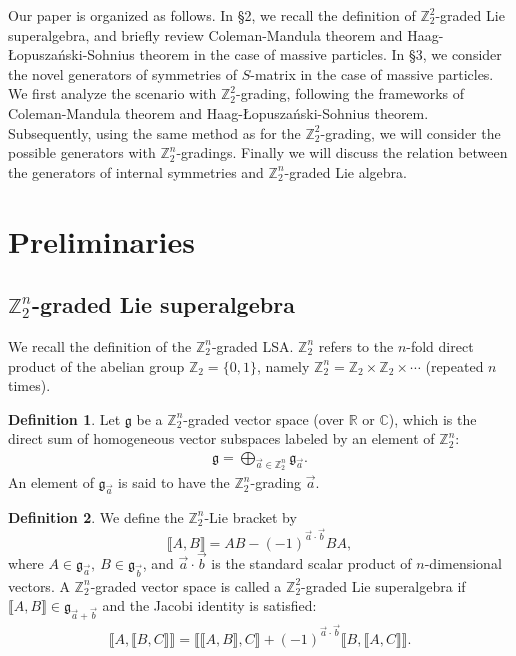 \documentclass[a4paper,12pt]{article}
\def\Z{\mathbb{Z}}
\def\g{\mathfrak{g}}
\def\HLS{Haag-\L opusza\'nski-Sohnius }
\def\CM{Coleman-Mandula }
\theoremstyle{plain}
\theoremstyle{definition}
\newtheorem{dfn}{Definition}
\begin{document}
Our paper is organized as follows. In \S 2, we recall the definition of $\Z_2^2$-graded Lie superalgebra\cite{RW1,RW2}, and  briefly review \CM theorem and \HLS theorem\cite{CM,HLS} in the case of massive particles. 
In \S 3, we consider the novel generators of symmetries of $S$-matrix in the case of massive particles. We first analyze the scenario with $\Z_2^2$-grading, following the frameworks of \CM theorem and \HLS theorem. Subsequently, using the same method as for the $\Z_2^2$-grading, we will consider the possible generators with $\Z_2^n$-gradings. Finally we will discuss the relation between the generators of internal symmetries and $\Z_2^n$-graded Lie algebra.




\section{Preliminaries}
\subsection{$\Z_2^n$-graded Lie superalgebra}
We recall the definition of the $\Z_2^n$-graded LSA\cite{RW1,RW2}.
$\Z_2^n$ refers to the $n$-fold direct product of the abelian group $\mathbb{Z}_2=\{0,1\}$, namely $\Z_2^n=\mathbb{Z}_2\times \mathbb{Z}_2 \times \cdots$ (repeated $n$ times). 
\begin{dfn}
 Let $\g$ be a $\Z_2^n$-graded vector space  (over $\mathbb{R}$ or $ \mathbb{C}$), which is the direct sum of homogeneous vector subspaces labeled by an element of $\Z_2^n$:
\begin{align}
 \g = \bigoplus_{\vec{a}\in\Z_2^n}\g_{\vec{a}}.\label{Z2n-VS}
\end{align}
An element of $ \g_{\vec{a}}$ is said to have the $\Z_2^n$-grading $\vec{a}$. 
\end{dfn}
\begin{dfn}\label{defsalg}
We define the $\Z_2^n$-Lie bracket by
\begin{equation}
	\llbracket A, B \rrbracket = AB - (-1)^{\vec{a}\cdot\vec{b}} BA, \label{Z2n-LB}
\end{equation}
where $A \in \g_{\vec{a}}, \ B \in \g_{\vec{b}}$, and $ \vec{a}\cdot\vec{b} $ is the standard scalar product of $n$-dimensional vectors. 
A $\Z_2^n$-graded vector space is called a $\Z_2^2$-graded Lie superalgebra if 
$ \llbracket A,B \rrbracket \in \g_{\vec{a}+\vec{b}} $ and the Jacobi identity is satisfied:
\begin{align}
 \llbracket A, \llbracket B,C \rrbracket \rrbracket
= \llbracket \llbracket A,B \rrbracket, C \rrbracket
+ (-1)^{\vec{a}\cdot \vec{b}} \llbracket B, \llbracket A, C \rrbracket \rrbracket. \label{Z2n-JI}
\end{align}
\end{dfn}
\end{document}
